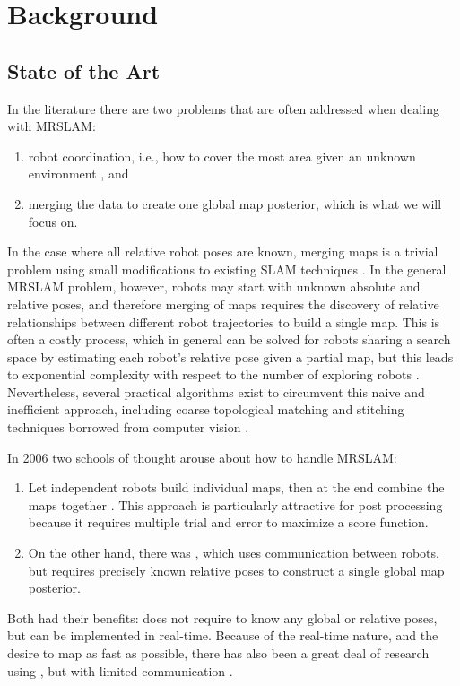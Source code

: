 \section{Background}
\label{S:Back}

\subsection{State of the Art}
\label{SS:Back:SOA}
    
In the literature there are two problems that are often addressed when dealing with MRSLAM:
\begin{enumerate}
\item robot coordination, i.e., how to cover the most area given an unknown environment \cite{julia2012comparison}, and
\item merging the data to create one global map posterior, which is what we will focus on.
\end{enumerate}

In the case where all relative robot poses are known, merging maps is a trivial problem using small modifications to existing SLAM techniques \cite{thrun2001probabilistic}. In the general MRSLAM problem, however, robots may start with unknown absolute and relative poses, and therefore merging of maps requires the discovery of relative relationships between different robot trajectories to build a single map. This is often a costly process, which in general can be solved for robots sharing a search space by estimating each robot's relative pose given a partial map, but this leads to exponential complexity with respect to the number of exploring robots \cite{fox2006distributed}. Nevertheless, several practical algorithms exist to circumvent this naive and inefficient approach,  including coarse topological matching and stitching techniques borrowed from computer vision \cite{birk2006merging}.

In 2006 two schools of thought arouse about how to handle MRSLAM:
\begin{enumerate}
\item Let independent robots build individual maps, then at the end combine the maps together \cite{birk2006merging}.  This approach is particularly attractive for post processing because it requires multiple trial and error to maximize a score function. 
\item On the other hand, there was \cite{howard2006multi}, which uses communication between robots, but requires precisely known relative poses to construct a single global map posterior.
\end{enumerate}
Both had their benefits: \cite{birk2006merging} does not require to know any global or relative poses, but \cite{howard2006multi} can be implemented in real-time.  Because of the real-time nature, and the desire to map as fast as possible, there has also been a great deal of research using \cite{howard2006multi}, but with limited communication \cite{lazaro2013multi}.

